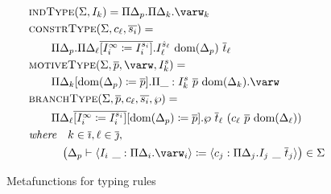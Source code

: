 \begin{figure}
\centering

\begin{align*}
    &\indtype{\Sigma}{I_k} = \Pi \Delta_p . \Pi \Delta_k . \varw_k \\
    &\constrtype{\Sigma}{c_\ell}{\overline{s_i}} = \\
    &\qquad \Pi \Delta_p . \Pi \Delta_\ell \overline{[I_i^\infty \coloneqq I_i^{s_i}]} . I_{\ell}^{\hat{s}_{\ell}}\ \dom{\Delta_p}\ \overline{t}_\ell \\
    &\motivetype{\Sigma}{\overline{p}}{\varw}{I_k^s} = \\
    &\qquad \Pi \Delta_k[\dom{\Delta_p} \coloneqq \overline{p}] . \Pi \_ : I_k^s\ \overline{p}\ \dom{\Delta_k} . \varw \\
    &\branchtype{\Sigma}{\overline{p}}{c_\ell}{\overline{s_i}}{\wp} = \\
    &\qquad \Pi \Delta_\ell \overline{[I_i^\infty \coloneqq I_i^{s_i}]}[\dom{\Delta_p} \coloneqq \overline{p}] . \wp\ \overline{t}_\ell\ (c_\ell\ \overline{p}\ \dom{\Delta_\ell}) \\
    &\textit{where}\quad k \in \overline{\imath}, \ell \in \overline{\jmath}, \\
    &\quad\qquad\big(\Delta_p \vdash \langle I_i\ \_ : \Pi\Delta_i . \varw_i \rangle \coloneqq \langle c_j : \Pi \Delta_j . I_j\ \_\ \overline{t}_j \rangle \big) \in \Sigma
\end{align*}

\caption{Metafunctions for typing rules}
\label{fig:metafunctions}
\end{figure}